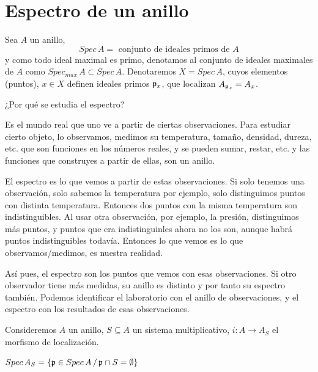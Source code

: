 \section{Espectro de un anillo}
\begin{defi}
    Sea $A$ un anillo,
    $$Spec \, A = \text{ conjunto de ideales primos de } A$$
    y como todo ideal maximal es primo, denotamos al conjunto de ideales maximales de $A$ como $Spec_{max} \, A \subset Spec\, A$. Denotaremos $X = Spec \, A$, cuyos elementos (puntos), $x\in X$ definen ideales primos $\mathfrak{p}_x$, que localizan $A_{\mathfrak{p}_x} = A_x$. 
\end{defi}
\begin{obs}
¿Por qu\'e se estudia el espectro?

Es el mundo real que uno ve a partir de ciertas observaciones. Para estudiar cierto objeto, lo observamos, medimos su temperatura, tamaño, densidad, dureza, etc. que son funciones en los n\'umeros reales, y se pueden sumar, restar, etc. y las funciones que construyes a partir de ellas, son un anillo. 

El espectro es lo que vemos a partir de estas observaciones. Si solo tenemos una observaci\'on, solo sabemos la temperatura por ejemplo, solo distinguimos puntos con distinta temperatura. Entonces dos puntos con la misma temperatura son indistinguibles. Al usar otra observaci\'on, por ejemplo, la presi\'on, distinguimos m\'as puntos, y puntos que era indistinguinles ahora no los son, aunque habr\'a puntos indistinguibles todav\'ia. Entonces lo que vemos es lo que observamos/medimos, es nuestra realidad. 

As\'i pues, el espectro son los puntos que vemos con esas observaciones. Si otro observador tiene m\'as medidas, su anillo es distinto y por tanto su espectro tambi\'en. Podemos identificar el laboratorio con el anillo de observaciones, y el espectro con los resultados de esas observaciones. 

Consideremos $A$ un anillo, $S \subseteq A$ un sistema multiplicativo, $i:A \longrightarrow A_S$ el morfismo de localizaci\'on.

\end{obs}\begin{teo}
    $Spec\, A_S = \{ \mathfrak{p} \in Spec \, A \, / \, \mathfrak{p} \cap S = \emptyset\}$
\end{teo}
